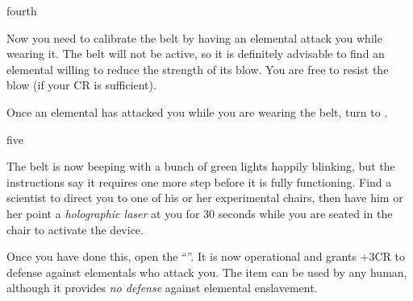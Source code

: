 \documentclass[notebook]{elementals}
\begin{document}
\begin{page}{fourth}

Now you need to calibrate the belt by having an elemental attack you while wearing it. The belt will not be active, so it is definitely advisable to find an elemental willing to reduce the strength of its blow. You are free to resist the blow (if your CR is sufficient).

Once an elemental has attacked you while you are wearing the belt, turn to .

\end{page}

\begin{page}{five}

The belt is now beeping with a bunch of green lights happily blinking, but the instructions say it requires one more step before it is fully functioning. Find a scientist to direct you to one of his or her experimental chairs, then have him or her point a \emph{holographic laser} \iHolographicLaser{\MYnumber} at you for 30 seconds while you are seated in the chair to activate the device.

Once you have done this, open the ``\iEleBelt{}''. It is now operational and grants +3CR to defense against elementals who attack you. The item can be used by any human, although it provides \emph{no defense} against elemental enslavement.

\end{page}

\endnotebook
\end{document}
